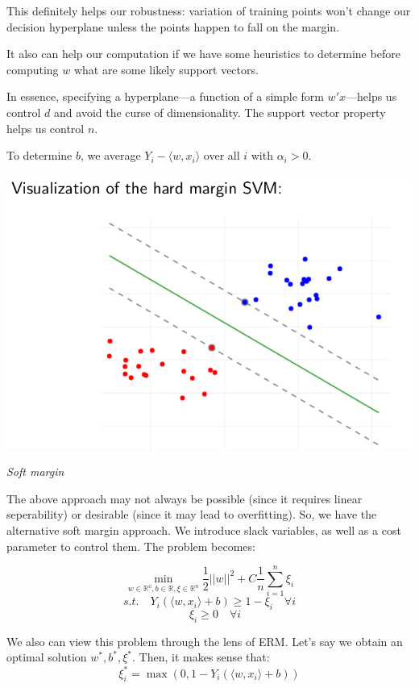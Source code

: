 \documentclass{minimal}
\begin{document}
This definitely helps our robustness: 
variation of training points won't change our decision hyperplane unless the
points happen to fall on the margin. 

It also can help our computation if we have
some heuristics to determine before computing $w$ what are some likely support
vectors.

In essence, specifying a hyperplane---a function of a simple form $w'x$---helps
us control $d$ and avoid the curse of dimensionality. The support vector
property helps us control $n$.

To determine $b$, we average $Y_i - \langle w, x_i \rangle$ over all $i$ with
$\alpha_i > 0$.

\includegraphics[scale=0.25]{svm1}

\medskip

\textit{Soft margin}

The above approach may not always be possible (since it requires linear
seperability) or desirable (since it may lead to overfitting). So, we have the
alternative soft margin approach. We introduce slack variables, as well as a 
cost parameter to control them. The problem becomes:

$$
\min_{w \in \mathbb{R^d}, b \in \mathbb{R}, \xi \in \mathbb{R}^n} 
\frac{1}{2} ||w||^2 + C \frac{1}{n} \sum_{i=1}^n \xi_i
$$
$$
s.t. \quad Y_i(\langle w, x_i \rangle + b) \geq 1 - \xi_i \quad \forall i
$$
$$
\quad \xi_i \geq 0 \quad \forall i
$$

We also can view this problem through the lens of ERM. Let's say we obtain an
optimal solution $w^*, b^*, \xi^*$. Then, it makes sense that:
$$
\xi_i^* = \max(0, 1 - Y_i(\langle w, x_i \rangle + b)) 
$$
\end{document}
